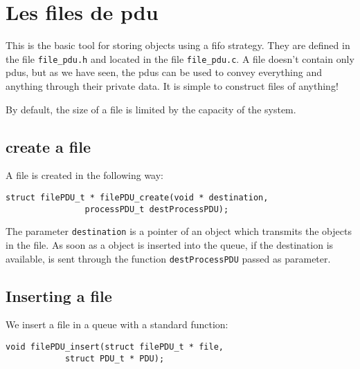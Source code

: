 %
\section{Les files de {\sc pdu}}
\label{section:file}
  

   This is the basic tool for storing objects using a {\sc fifo} strategy. They are defined in the file {\tt file\_pdu.h}
and located in the file {\tt file\_pdu.c}. A file doesn't contain only
{\sc pdu}s, but as we have seen, the {\sc pdu}s can be
used to convey everything and anything through their private data. It is simple to construct files of anything!

    By default, the size of a file is limited by the capacity of the
system.
  
%
\subsection{create a file}

   A file is created in the following way:

\begin{verbatim}
struct filePDU_t * filePDU_create(void * destination,
			    processPDU_t destProcessPDU);
\end{verbatim}

   The parameter \lstinline!destination! is a pointer of an object 
which transmits the objects in the file. As soon as a
object is inserted into the queue, if the destination is available,
is sent through the function \lstinline!destProcessPDU! passed as parameter.

%
\subsection{Inserting a file}

   
   We insert a file in a queue with a standard function:
  

\begin{verbatim}
void filePDU_insert(struct filePDU_t * file,
		    struct PDU_t * PDU);
\end{verbatim}

